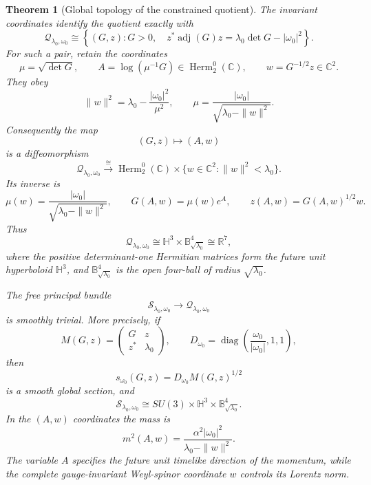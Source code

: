 \documentclass[11pt]{article}
\newtheorem{theorem}{Theorem}[section]
\theoremstyle{definition}
\newcommand{\C}{\mathbb C}
\newcommand{\R}{\mathbb R}
\newcommand{\Herm}{\operatorname{Herm}}
\newcommand{\diag}{\operatorname{diag}}
\newcommand{\adj}{\operatorname{adj}}
\newcommand{\cQ}{\mathscr Q}
\newcommand{\cS}{\mathscr S}
\begin{document}
\begin{theorem}[Global topology of the constrained quotient]\label{thm:constrained-topology}
The invariant coordinates identify the quotient exactly with
\[
 \cQ_{\lambda_0,\omega_0}
 \cong
 \left\{(G,z):G>0,\quad
 z^*\adj(G)z=\lambda_0\det G-|\omega_0|^2\right\}.
\]
For such a pair, retain the coordinates
\[
 \mu=\sqrt{\det G},\qquad
 A=\log(\mu^{-1}G)\in\Herm_2^0(\C),
 \qquad
 w=G^{-1/2}z\in\C^2.
\]
They obey
\[
 \|w\|^2=\lambda_0-\frac{|\omega_0|^2}{\mu^2},
 \qquad
 \mu=\frac{|\omega_0|}
 {\sqrt{\lambda_0-\|w\|^2}}.
\]
Consequently the map
\[
 (G,z)\longmapsto(A,w)
\]
is a diffeomorphism
\[
 \boxed{
 \cQ_{\lambda_0,\omega_0}
 \xrightarrow{\ \cong\ }
 \Herm_2^0(\C)\times
 \{w\in\C^2:\|w\|^2<\lambda_0\}.}
\]
Its inverse is
\[
 \boxed{
 \mu(w)=\frac{|\omega_0|}
 {\sqrt{\lambda_0-\|w\|^2}},\qquad
 G(A,w)=\mu(w)e^A,
 \qquad
 z(A,w)=G(A,w)^{1/2}w.}
\]
Thus
\[
 \cQ_{\lambda_0,\omega_0}
 \cong \mathbb H^3\times\mathbb B^4_{\sqrt{\lambda_0}}
 \cong\R^7,
\]
where the positive determinant-one Hermitian matrices form the future unit
hyperboloid $\mathbb H^3$, and $\mathbb B^4_{\sqrt{\lambda_0}}$ is the open
four-ball of radius $\sqrt{\lambda_0}$.

The free principal bundle
\[
 \cS_{\lambda_0,\omega_0}
 \longrightarrow\cQ_{\lambda_0,\omega_0}
\]
is smoothly trivial.  More precisely, if
\[
 M(G,z)=\begin{pmatrix}G&z\\z^*&\lambda_0\end{pmatrix},
 \qquad
 D_{\omega_0}=\diag\left(\frac{\omega_0}{|\omega_0|},1,1\right),
\]
then
\[
 s_{\omega_0}(G,z)=D_{\omega_0}M(G,z)^{1/2}
\]
is a smooth global section, and
\[
 \boxed{
 \cS_{\lambda_0,\omega_0}
 \cong SU(3)\times\mathbb H^3\times
 \mathbb B^4_{\sqrt{\lambda_0}}.}
\]
In the $(A,w)$ coordinates the mass is
\[
 \boxed{
 m^2(A,w)=
 \frac{\alpha^2|\omega_0|^2}
 {\lambda_0-\|w\|^2}.}
\]
The variable $A$ specifies the future unit timelike direction of the momentum,
while the complete gauge-invariant Weyl-spinor coordinate $w$ controls its
Lorentz norm.
\end{theorem}
\end{document}
